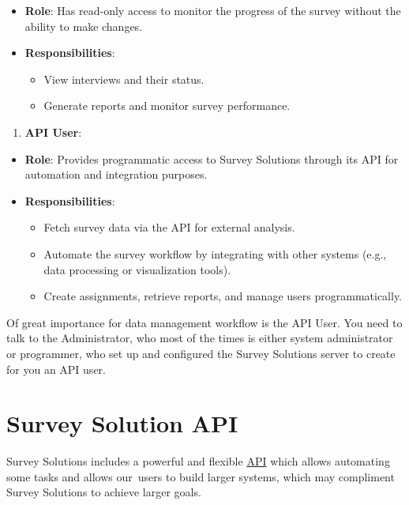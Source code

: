 \documentclass[
  letterpaper,
  DIV=11,
  numbers=noendperiod]{scrreprt}
\providecommand{\tightlist}{%
  \setlength{\itemsep}{0pt}\setlength{\parskip}{0pt}}\usepackage{longtable,booktabs,array}
\begin{document}
\begin{itemize}
\item
  \textbf{Role}: Has read-only access to monitor the progress of the
  survey without the ability to make changes.
\item
  \textbf{Responsibilities}:

  \begin{itemize}
  \item
    View interviews and their status.
  \item
    Generate reports and monitor survey performance.
  \end{itemize}
\end{itemize}

\begin{enumerate}
\def\labelenumi{\arabic{enumi}.}
\setcounter{enumi}{5}
\tightlist
\item
  \textbf{API User}:
\end{enumerate}

\begin{itemize}
\item
  \textbf{Role}: Provides programmatic access to Survey Solutions
  through its API for automation and integration purposes.
\item
  \textbf{Responsibilities}:

  \begin{itemize}
  \item
    Fetch survey data via the API for external analysis.
  \item
    Automate the survey workflow by integrating with other systems
    (e.g., data processing or visualization tools).
  \item
    Create assignments, retrieve reports, and manage users
    programmatically.
  \end{itemize}
\end{itemize}

Of great importance for data management workflow is the API User. You
need to talk to the Administrator, who most of the times is either
system administrator or programmer, who set up and configured the Survey
Solutions server to create for you an API user.

\section{Survey Solution API}\label{survey-solution-api}

Survey Solutions includes a powerful and flexible
\href{https://docs.mysurvey.solutions/headquarters/api/survey-solutions-api/}{API}
which allows automating some tasks and allows our~users to build larger
systems, which may compliment Survey Solutions to achieve larger goals.~
\end{document}
